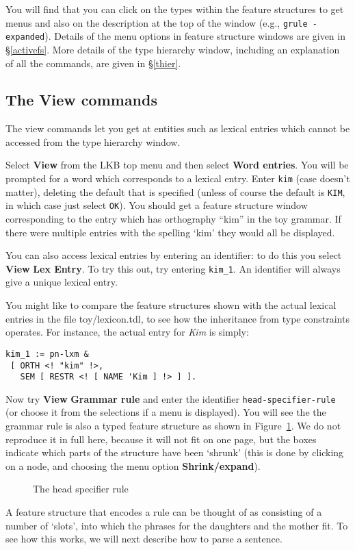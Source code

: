 \documentclass[12pt]{report}
\newcommand{\lkbmenucommand}{\bf}
\begin{document}
You will find that
you can click on the types within the feature structures to get menus
and also on the description at the top of the window
(e.g., {\tt grule - expanded}).
Details of the menu options in feature structure windows 
are given in \S\ref{activefs}.
More details of the type hierarchy window, including an explanation of all the
commands,
are given in \S\ref{thier}.

\subsection{The View commands}

The view commands let you get at entities such as lexical entries which cannot
be accessed from the type hierarchy window.  

Select {\lkbmenucommand View} from the LKB top menu and then select 
{\lkbmenucommand Word entries}.
You will be prompted for a word which corresponds to a lexical entry.
Enter {\tt kim} (case doesn't matter), deleting the default that
is specified (unless of course the default is {\tt KIM}, in which
case just select {\tt OK}).
You should get a feature structure window corresponding to the entry 
which has orthography ``kim'' in the toy grammar.
If there were multiple entries with the spelling `kim' they would all
be displayed. 

You can also access lexical entries by entering an identifier: to
do this you select {\lkbmenucommand View} {\lkbmenucommand Lex Entry}.  
To try this out, try entering {\tt kim\_1}.
An identifier will always
give a unique lexical entry.  

You might like 
to compare the feature structures shown with the actual lexical
entries in the file toy/lexicon.tdl, to see how the inheritance from type
constraints operates.  For instance, the actual entry for {\it Kim} is
simply:
\begin{verbatim}
kim_1 := pn-lxm & 
 [ ORTH <! "kim" !>,
   SEM [ RESTR <! [ NAME 'Kim ] !> ] ].
\end{verbatim}

Now try {\lkbmenucommand View} {\lkbmenucommand Grammar rule} and 
enter the identifier
{\tt head-specifier-rule} (or choose
it from the selections if a 
menu is displayed).  You will see the the grammar rule
is also a typed feature structure as shown in Figure~\ref{rulefs}.
We do not reproduce it in full here, because
it will not fit on one page, but the boxes indicate which parts of the
structure have been `shrunk' (this is done by clicking on a node,
and choosing the menu option {\lkbmenucommand Shrink/expand}).
\begin{figure}
\epsfxsize=4in
\caption{The head specifier rule}
\label{rulefs}
\end{figure}
A feature structure that encodes a rule can be thought of
as consisting of a number of `slots', into which the phrases for
the daughters and the mother fit.  To see how this works,
we will next describe how to parse a sentence.
\end{document}
